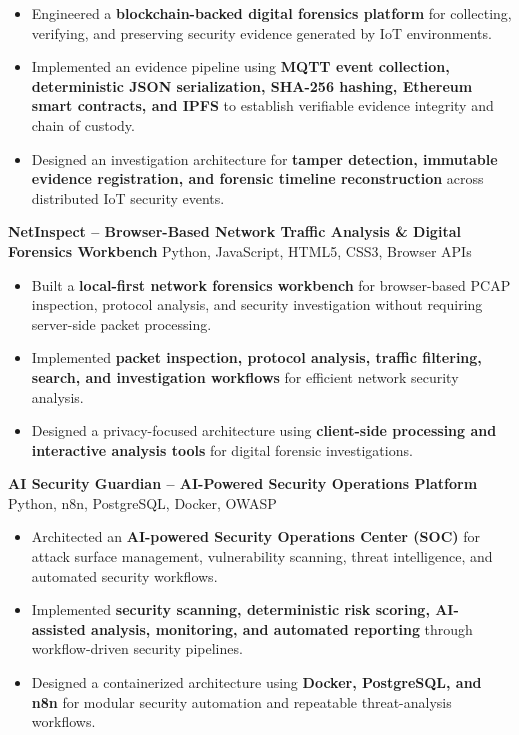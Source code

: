 \documentclass[a4paper,11pt]{article}
\newcommand{\resumeItem}[1]{
\item \small{#1 \vspace{-2pt}}
}
\newcommand{\resumeProject}[2]{
\vspace{2pt}
\textbf{#1} \hfill {\small #2}
\vspace{2pt}
}
\begin{document}
\begin{itemize}[leftmargin=*]

\resumeItem{Engineered a \textbf{blockchain-backed digital forensics platform} for collecting, verifying, and preserving security evidence generated by IoT environments.}

\resumeItem{Implemented an evidence pipeline using \textbf{MQTT event collection, deterministic JSON serialization, SHA-256 hashing, Ethereum smart contracts, and IPFS} to establish verifiable evidence integrity and chain of custody.}

\resumeItem{Designed an investigation architecture for \textbf{tamper detection, immutable evidence registration, and forensic timeline reconstruction} across distributed IoT security events.}

\end{itemize}

\vspace{1mm}

\resumeProject
{NetInspect -- Browser-Based Network Traffic Analysis \& Digital Forensics Workbench}
{Python, JavaScript, HTML5, CSS3, Browser APIs}

\begin{itemize}[leftmargin=*]

\resumeItem{Built a \textbf{local-first network forensics workbench} for browser-based PCAP inspection, protocol analysis, and security investigation without requiring server-side packet processing.}

\resumeItem{Implemented \textbf{packet inspection, protocol analysis, traffic filtering, search, and investigation workflows} for efficient network security analysis.}

\resumeItem{Designed a privacy-focused architecture using \textbf{client-side processing and interactive analysis tools} for digital forensic investigations.}

\end{itemize}

\vspace{1mm}

\resumeProject
{AI Security Guardian -- AI-Powered Security Operations Platform}
{Python, n8n, PostgreSQL, Docker, OWASP}

\begin{itemize}[leftmargin=*]

\resumeItem{Architected an \textbf{AI-powered Security Operations Center (SOC)} for attack surface management, vulnerability scanning, threat intelligence, and automated security workflows.}

\resumeItem{Implemented \textbf{security scanning, deterministic risk scoring, AI-assisted analysis, monitoring, and automated reporting} through workflow-driven security pipelines.}

\resumeItem{Designed a containerized architecture using \textbf{Docker, PostgreSQL, and n8n} for modular security automation and repeatable threat-analysis workflows.}

\end{itemize}
\end{document}
